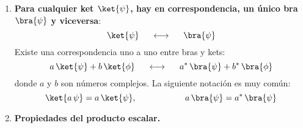 \begin{enumerate}[label=\alph*)]
\item \textbf{Para cualquier ket $\ket{\psi}$, hay en correspondencia, un único bra $\bra{\psi}$ y viceversa}:
\begin{equation}
\ket{\psi} \hspace{0.5cm} \longleftrightarrow \hspace{0.5cm} \bra{\psi}
\label{eq:ecuacion_02_26}
\end{equation}
Existe una correspondencia uno a uno entre bras y kets:
\begin{equation}
a \, \ket{\psi} + b \, \ket{\phi} \hspace{0.5cm} \longleftrightarrow \hspace{0.5cm} a^{*} \, \bra{\psi}
+ b^{*} \, \bra{\phi} \label{eq:ecuacion_02_27}
\end{equation}
donde $a$ y $b$ son números complejos. La siguiente notación es muy común:
\begin{equation}
\ket{a \, \psi} =  a \, \ket{\psi}, \hspace{2cm} a \, \bra{\psi} = a^{*} \, \bra{\psi}
\label{eq:ecuacion_02_28}
\end{equation}
\item \textbf{Propiedades del producto escalar.}


\end{enumerate}

